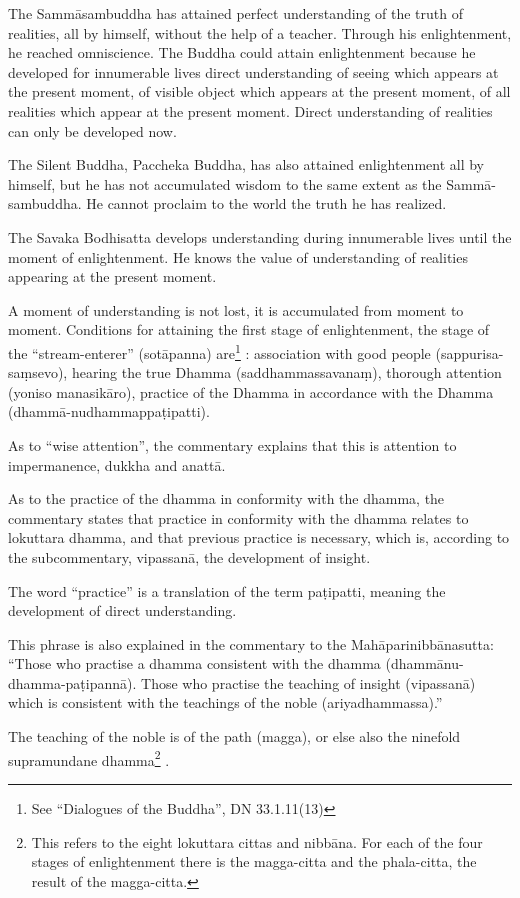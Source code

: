 The Sammāsambuddha has attained perfect understanding of the truth of
realities, all by himself, without the help of a teacher. Through his
enlightenment, he reached omniscience. The Buddha could attain
enlightenment because he developed for innumerable lives direct
understanding of seeing which appears at the present moment, of visible
object which appears at the present moment, of all realities which
appear at the present moment. Direct understanding of realities can only
be developed now.

The Silent Buddha, Paccheka Buddha, has also attained enlightenment all
by himself, but he has not accumulated wisdom to the same extent as the
Sammā-sambuddha. He cannot proclaim to the world the truth he has
realized.

The Savaka Bodhisatta develops understanding during innumerable lives
until the moment of enlightenment. He knows the value of understanding
of realities appearing at the present moment.

A moment of understanding is not lost, it is accumulated from moment to
moment. Conditions for attaining the first stage of enlightenment, the
stage of the ``stream-enterer'' (sotāpanna)
are\footnote{See ``Dialogues of the
Buddha'', DN 33.1.11(13)} : association with good
people (sappurisa-saṃsevo), hearing the true Dhamma (saddhammassavanaṃ),
thorough attention (yoniso manasikāro), practice of the Dhamma in
accordance with the Dhamma (dhammā-nudhammap\-paṭipatti).

As to ``wise attention'', the commentary explains that this is attention
to impermanence, dukkha and anattā.

As to the practice of the dhamma in conformity with the dhamma, the
commentary states that practice in conformity with the dhamma relates to
lokuttara dhamma, and that previous practice is necessary, which is,
according to the subcommentary, vipassanā, the development of insight.

The word ``practice'' is a translation of the term paṭipatti, meaning
the development of direct understanding.

This phrase is also explained in the commentary to the
Mahāparinib\-bānasutta: ``Those who practise a dhamma consistent with the
dhamma (dhammānu-dhamma-paṭipannā). Those who practise the teaching of
insight (vipassanā) which is consistent with the teachings of the noble
(ariyadhammassa).''

The teaching of the noble is of the path (magga), or else also the
ninefold supramundane
dhamma\footnote{This refers to the eight
lokuttara cittas and nibbāna. For each of the four stages of
enlightenment there is the magga-citta and the phala-citta, the result
of the magga-citta.} .


